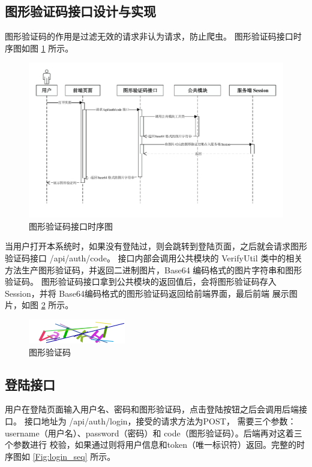 \subsection{图形验证码接口设计与实现}
图形验证码的作用是过滤无效的请求非认为请求，防止爬虫。
图形验证码接口时序图如图 \ref{Fig:code_seq} 所示。

\begin{figure}[ht]
    \centering
    \includegraphics[width=0.9\linewidth]{./Figure/IMG_code_seq.pdf}
    \caption{图形验证码接口时序图}\label{Fig:code_seq}
\end{figure}

当用户打开本系统时，如果没有登陆过，则会跳转到登陆页面，之后就会请求图形验证码接口 /api/auth/code。
接口内部会调用公共模块的 VerifyUtil 类中的相关方法生产图形验证码，并返回二进制图片，Base64 编码格式的图片字符串和图形验证码。
图形验证码接口拿到公共模块的返回值后，会将图形验证码存入Session，并将 Base64编码格式的图形验证码返回给前端界面，最后前端
展示图片，如图 \ref{Fig:code_eg} 所示。

\begin{figure}[ht]
    \centering
    \includegraphics[width=0.5\linewidth]{./Figure/IMG_code.png}
    \caption{图形验证码}\label{Fig:code_eg}
\end{figure}

\subsection{登陆接口}
用户在登陆页面输入用户名、密码和图形验证码，点击登陆按钮之后会调用后端接口。
接口地址为 /api/auth/login，接受的请求方法为POST，
需要三个参数：username（用户名）、password（密码）和 code（图形验证码）。后端再对这着三个参数进行
校验，如果通过则将用户信息和token（唯一标识符）返回。完整的时序图如 \ref{Fig:login_seq} 所示。

